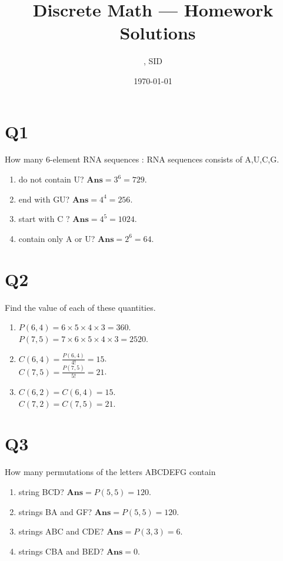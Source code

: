 \documentclass[a4paper,11pt]{article}
\title{Discrete Math --- Homework \Homework \ Solutions}
\author{\Name, SID \SID}
\date{\today}
\newenvironment{qparts}{\begin{enumerate}[{(}a{)}]}{\end{enumerate}}
\newenvironment{solution}{{\\\bf Solution}:}{\smallskip}
\begin{document}
\maketitle

\section*{Q1}
How many 6-element RNA sequences
\begin{solution}
    RNA sequences consists of A,U,C,G.
    \begin{qparts}
        \item do not contain U?
        $\textbf{Ans}=3^{6}=729$.
        
        \item end with GU?
        $\textbf{Ans}=4^{4}=256$.

        \item start with C ?
        $\textbf{Ans}=4^{5}=1024$.

        \item contain only A or U?
        $\textbf{Ans}=2^{6}=64$.
    \end{qparts}
\end{solution}

\section*{Q2}
Find the value of each of these quantities.
\begin{qparts}
    
    \item $P(6,4)=6\times 5\times 4\times 3=360$.\\
    $P(7,5)=7\times 6\times 5\times 4\times 3=2520$.
    
    \item $C(6,4)=\frac{P(6,4)}{4!}=15$.\\
    $C(7,5)=\frac{P(7,5)}{5!}=21$.
    
    \item $C(6,2)=C(6,4)=15$.\\
    $C(7,2)=C(7,5)=21$.
\end{qparts}

\section*{Q3}
How many permutations of the letters ABCDEFG contain
\begin{qparts}
    
    \item string BCD?
    $\textbf{Ans}=P(5,5)=120$.
    \item strings BA and GF?
    $\textbf{Ans}=P(5,5)=120$.
    \item strings ABC and CDE?
    $\textbf{Ans}=P(3,3)=6$.
    \item strings CBA and BED?
    $\textbf{Ans}=0$.
\end{qparts}
\end{document}
